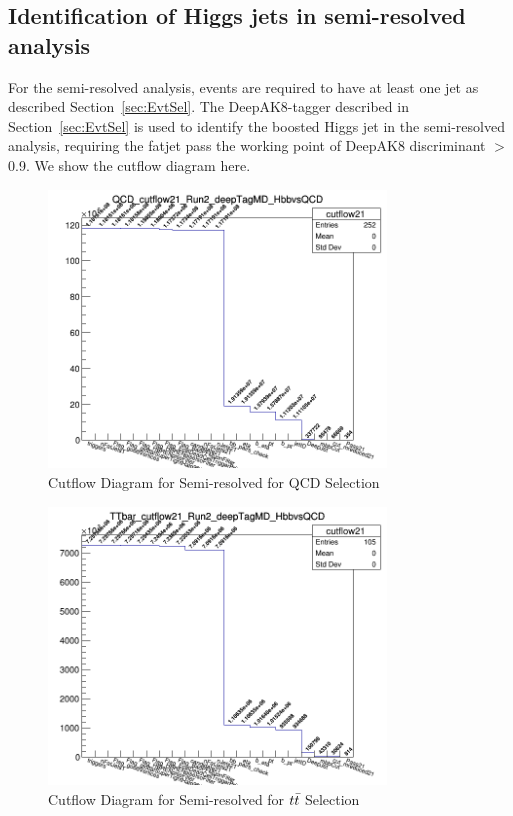 \subsection{Identification of Higgs jets in semi-resolved analysis\label{sec:EvtSelBtagging}}
For the semi-resolved analysis, events are required to have at least one jet as described Section~\ref{sec:EvtSel}. The DeepAK8-tagger described in Section~\ref{sec:EvtSel} is used to identify the boosted Higgs jet in the semi-resolved analysis, requiring the fatjet pass the working point of DeepAK8 discriminant $>$ 0.9. 
We show the cutflow diagram here.
\begin{figure}[!htb]
	\centering
	\includegraphics[width=0.8\textwidth]{Figures/QCD_cutflow21_Run2_deepTagMD_HbbvsQCD.png}
	\caption{Cutflow Diagram for Semi-resolved for QCD Selection}
	\label{fig:21Cutflowqcd}
\end{figure}
\begin{figure}[!htb]
	\centering
    \includegraphics[width=0.8\textwidth]{Figures/ttbar_cutflow21_Run2_deepTagMD_HbbvsQCD.png}
	\caption{Cutflow Diagram for Semi-resolved for $t\bar{t} $ Selection}
	\label{fig:21Cutflowtt}
\end{figure}

